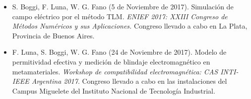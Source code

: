 \begin{itemize}
 

	\item S. Boggi, F. Luna, W. G. Fano (5 de Noviembre de 2017). Simulación de campo eléctrico por el método TLM. \textit{ENIEF 2017: XXIII Congreso de Métodos Numéricos y sus Aplicaciones.} Congreso llevado a cabo en La Plata, Provincia de Buenos Aires.

	\item F. Luna, S. Boggi, W. G. Fano (24 de Noviembre de 2017). Modelo de permitividad efectiva y medición de blindaje electromagnético en metamateriales. \textit{Workshop de compatibilidad electromagnética: CAS INTI-IEEE Argentina 2017}. Congreso llevado a cabo en las instalaciones del Campus Miguelete del Instituto Nacional de Tecnología Industrial.
	
\end{itemize}

